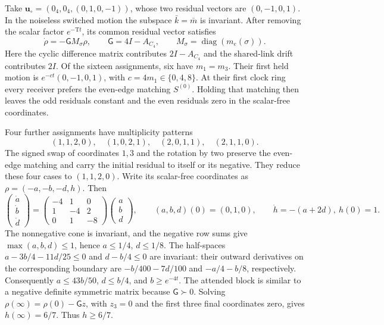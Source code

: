 Take \(\mathbf u_\circ=(0_4,0_4,(0,1,0,-1))\), whose two residual vectors
are \((0,-1,0,1)\). In the noiseless switched motion the subspace
\(\bar k=\bar m\) is invariant. After removing the scalar factor
\(e^{-\mathrm Tt}\), its common residual vector satisfies
\begin{equation}
 \dot\rho=-\mathsf G M_\sigma\rho,\qquad
 \mathsf G=4I-A_{C_4},\qquad
 M_\sigma=\operatorname{diag}(m_e(\sigma)).
\label{eq:phil-selection-tied-residual}
\end{equation}
Here the cyclic difference matrix contributes
\(2I-A_{C_4}\) and the shared-link drift contributes \(2I\).
Of the sixteen assignments, six have \(m_1=m_3\). Their first held motion
is \(e^{-ct}(0,-1,0,1)\), with \(c=4m_1\in\{0,4,8\}\).
At their first clock ring every receiver prefers the even-edge matching
\(S^{(0)}\). Holding that matching then leaves the odd residuals constant
and the even residuals zero in the scalar-free coordinates.

Four further assignments have multiplicity patterns
\[
 (1,1,2,0),\quad(1,0,2,1),\quad(2,0,1,1),\quad(2,1,1,0).
\]
The signed swap of coordinates \(1,3\) and the rotation by two preserve
the even-edge matching and carry the initial residual to itself or its
negative. They reduce these four cases to \((1,1,2,0)\). Write its
scalar-free coordinates as \(\rho=(-a,-b,-d,h)\). Then
\[
 \begin{pmatrix}\dot a\\\dot b\\\dot d\end{pmatrix}
 =\begin{pmatrix}-4&1&0\\1&-4&2\\0&1&-8\end{pmatrix}
   \begin{pmatrix}a\\b\\d\end{pmatrix},\qquad
 (a,b,d)(0)=(0,1,0),\qquad \dot h=-(a+2d),\ h(0)=1.
\]
The nonnegative cone is invariant, and the negative row sums give
\(\max(a,b,d)\le1\), hence \(a\le1/4\), \(d\le1/8\).
The half-spaces
\(a-3b/4-11d/25\le0\) and \(d-b/4\le0\) are invariant: their
outward derivatives on the corresponding boundary are
\(-b/400-7d/100\) and \(-a/4-b/8\), respectively. Consequently
\(a\le43b/50\), \(d\le b/4\), and \(b\ge e^{-4t}\).
The attended block is similar to a negative definite symmetric matrix
because \(\mathsf G\succ0\). Solving
\(\rho(\infty)=\rho(0)-\mathsf G z\), with \(z_3=0\) and the first
three final coordinates zero, gives \(h(\infty)=6/7\). Thus
\(h\ge6/7\).

